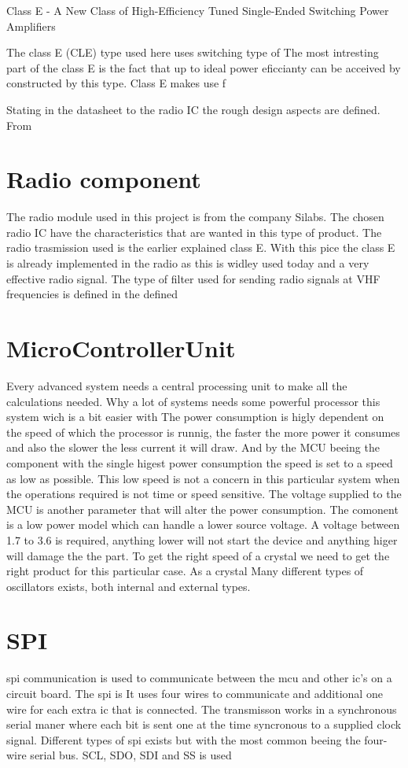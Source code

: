 \cite{class_e_new}
Class E - A New Class of High-Efficiency Tuned Single-Ended Switching Power Amplifiers

The class E (CLE) type used here uses switching type of 
The most intresting part of the class E is the fact that up to ideal power eficcianty can be acceived by constructed by this type. Class E makes use f

Stating in the datasheet to the radio IC the rough design aspects are defined. From

\section{Radio component}
 The radio module used in this project is from the company Silabs. The chosen radio IC have the characteristics that are wanted in this type of product. The radio trasmission used is the earlier explained class E. With this pice the class E is already implemented in the radio as this is widley used today and a very effective radio signal. 
The type of filter used for sending radio signals at VHF frequencies is defined in the defined 

\section{MicroControllerUnit}
Every advanced system needs a central processing unit to make all the calculations needed. Why a lot of systems needs some powerful processor this system wich is a bit easier with 
The power consumption is higly dependent on the speed of which the processor is runnig, the faster the more power it consumes and also the slower the less current it will draw. And by the MCU beeing the component with the single higest power consumption the speed is set to a speed as low as possible. This low speed is not a concern in this particular system when the operations required is not time or speed sensitive. The voltage supplied to the MCU is another parameter that will alter the power consumption. The comonent is a low power model which can handle a lower source voltage. A voltage between 1.7 to 3.6 is required, anything lower will not start the device and anything higer will damage the the part. 
To get the right speed of a crystal we need to get the right product for this particular case. As a crystal 
Many different types of oscillators exists, both internal and external types. 

\section{SPI}
\gls{spi} communication is used to communicate between the \gls{mcu} and other \gls{ic}'s on a circuit board. The \gls{spi} is 
It uses four wires to communicate and additional one wire for each extra \gls{ic} that is connected. The transmisson works in a synchronous serial maner where each bit is sent one at the time syncronous to a supplied clock signal. Different types of \gls{spi} exists but with the most common beeing the four-wire serial bus. SCL, SDO, SDI and SS is used 

